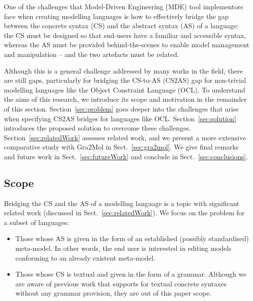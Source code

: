 \documentclass{llncs}
\begin{document}
One of the challenges that Model-Driven Engineering (MDE) tool implementors face when creating modelling languages is how to effectively bridge the gap between the concrete syntax (CS) and the abstract syntax (AS) of a language: the CS must be designed so that end-users have a familiar and accessible syntax, whereas the AS must be provided behind-the-scenes to enable model management and manipulation -- and the two artefacts must be related.

Although this is a general challenge addressed by many works in the field, there are still gaps, particularly for bridging the CS-to-AS (CS2AS) gap for non-trivial modelling languages like the Object Constraint Language (OCL). %
To understand the aims of this research, we introduce its scope and motivation in the remainder of this section. Section~\ref{sec:problem} goes deeper into the challenges that arise when specifying CS2AS bridges for languages like OCL. Section~\ref{sec:solution} introduces the proposed solution to overcome these challenges. Section~\ref{sec:relatedWork} assesses related work, and we present a more extensive comparative study with Gra2Mol in Sect.~\ref{sec:gra2mol}. We give final remarks and future work in Sect.~\ref{sec:futureWork} and conclude in Sect.~\ref{sec:conclusions}.

\subsection{Scope}
\label{subsec:scope}

Bridging the CS and the AS of a modelling language is a topic with significant related work (discussed in Sect.~\ref{sec:relatedWork}).
We focus on the problem for a subset of languages:
\begin{itemize}
\item Those whose AS is given in the form of an established (possibly standardised) meta-model. In other words, the end user is interested in editing models conforming to an already existent meta-model.%
\item Those whose CS is textual and given in the form of a grammar. Although we are aware of previous work \cite{jouault2006tcs,heidenreich2011emfText,voelter2011mps} that supports for textual concrete syntaxes without any grammar provision, they are out of this paper scope. %
\end{itemize}
\end{document}
